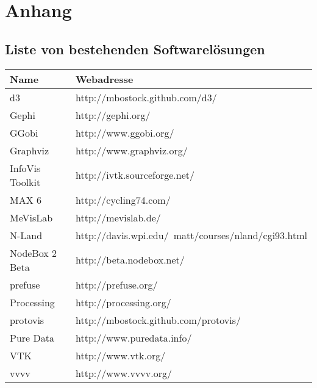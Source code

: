 \documentclass[a4paper, 
               12pt,
               DIV=calc,
               version=first,
               pdftex,
               headsepline,
               footsepline,
               bibtotocnumbered,
               liststotocnumbered]{scrreprt}
\begin{document}
\chapter{Anhang}
\section{Liste von bestehenden Softwarelösungen}
\label{sec:Softwareliste}
\begin{tabular}{l|l}
\hline
Name & Webadresse \\
\hline
d3 & http://mbostock.github.com/d3/\\
Gephi & http://gephi.org/\\
GGobi & http://www.ggobi.org/\\
Graphviz & http://www.graphviz.org/\\
InfoVis Toolkit & http://ivtk.sourceforge.net/\\
MAX 6 & http://cycling74.com/\\
MeVisLab & http://mevislab.de/\\
N-Land & http://davis.wpi.edu/~matt/courses/nland/cgi93.html\\
NodeBox 2 Beta & http://beta.nodebox.net/\\
prefuse & http://prefuse.org/\\
Processing & http://processing.org/\\
protovis & http://mbostock.github.com/protovis/\\
Pure Data & http://www.puredata.info/\\
VTK & http://www.vtk.org/\\
vvvv & http://www.vvvv.org/\\
\hline
\end{tabular}
\end{document}
